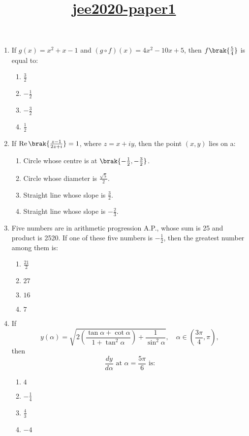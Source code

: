 \documentclass{article}
\title{\underline{\textbf{jee2020-paper1}}}
\date{}
\begin{document}
\maketitle
\begin{enumerate}

\item If $g(x) = x^2 + x - 1$ and $(g \circ f)(x) = 4x^2 - 10x + 5$, then $f\brak{\frac{5}{4}}$ is equal to:  
\begin{enumerate}
    \item $\frac{3}{2}$
    \item $-\frac{1}{2}$
    \item $-\frac{3}{2}$
    \item $\frac{1}{2}$
\end{enumerate}

\item If $\operatorname{Re}\brak{\frac{z - 1}{2z + i}} = 1$, where $z = x + iy$, then the point $(x, y)$ lies on a:

\begin{enumerate}
    \item Circle whose centre is at $\brak{-\frac{1}{2}, -\frac{3}{2}}$.
    \item Circle whose diameter is ${\frac{\sqrt{5}}{2}}$.
    \item Straight line whose slope is ${\frac{3}{2}}$.
    \item Straight line whose slope is ${-\frac{2}{3}}$.
\end{enumerate}


\item Five numbers are in arithmetic progression A.P., whose sum is 25 and product is 2520. If one of these five numbers is $-\frac{1}{2}$, then the greatest number among them is:  

\begin{enumerate}
    \item $\frac{21}{2}$
    \item $27$
    \item $16$
    \item $7$
\end{enumerate}

\item If 
\[
y(\alpha) = \sqrt{2 \left( \frac{\tan \alpha + \cot \alpha}{1 + \tan^2 \alpha} \right) + \frac{1}{\sin^2 \alpha}}, \quad \alpha \in \left( \frac{3\pi}{4}, \pi \right),
\]
then 
\[
\frac{dy}{d\alpha} \text{ at } \alpha = \frac{5\pi}{6} \text{ is:}
\]

\begin{enumerate}
    \item $4$
    \item $-\frac{1}{4}$
    \item $\frac{4}{3}$
    \item $-4$
\end{enumerate}


\end{enumerate}
\end{document}
